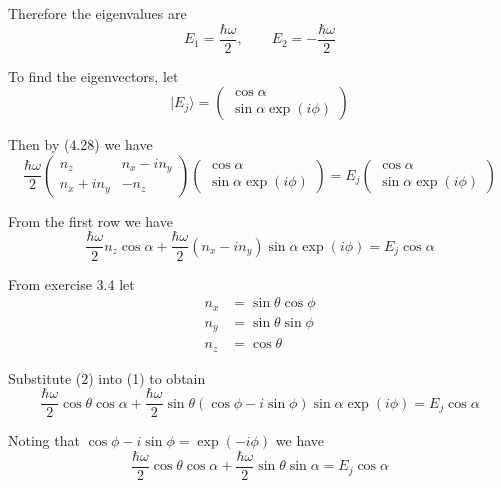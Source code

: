 Therefore the eigenvalues are
\begin{equation*}
E_1=\frac{\hbar\omega}{2},\qquad E_2=-\frac{\hbar\omega}{2}
\end{equation*}

To find the eigenvectors, let
\begin{equation*}
|E_j\rangle=\begin{pmatrix}\cos\alpha\\\sin\alpha\exp(i\phi)\end{pmatrix}
\end{equation*}

Then by (4.28) we have
\begin{equation*}
\frac{\hbar\omega}{2}
\begin{pmatrix}
n_z & n_x-in_y
\\
n_x+in_y & -n_z
\end{pmatrix}
\begin{pmatrix}\cos\alpha\\\sin\alpha\exp(i\phi)\end{pmatrix}
=E_j\begin{pmatrix}\cos\alpha\\\sin\alpha\exp(i\phi)\end{pmatrix}
\end{equation*}

From the first row we have
\begin{equation*}
\frac{\hbar\omega}{2}n_z\cos\alpha+\frac{\hbar\omega}{2}(n_x-in_y)\sin\alpha\exp(i\phi)
=E_j\cos\alpha
\tag{1}
\end{equation*}

From exercise 3.4 let
\begin{equation*}
\begin{aligned}
n_x&=\sin\theta\cos\phi
\\
n_y&=\sin\theta\sin\phi
\\
n_z&=\cos\theta
\end{aligned}
\tag{2}
\end{equation*}

Substitute (2) into (1) to obtain
\begin{equation*}
\frac{\hbar\omega}{2}\cos\theta\cos\alpha
+\frac{\hbar\omega}{2}\sin\theta(\cos\phi-i\sin\phi)\sin\alpha\exp(i\phi)
=E_j\cos\alpha
\end{equation*}

Noting that $\cos\phi-i\sin\phi=\exp(-i\phi)$ we have
\begin{equation*}
\frac{\hbar\omega}{2}\cos\theta\cos\alpha
+\frac{\hbar\omega}{2}\sin\theta\sin\alpha
=E_j\cos\alpha
\end{equation*}

